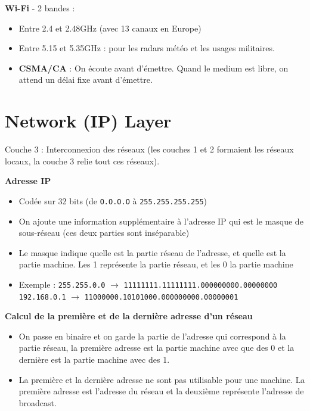 \documentclass[a4paper,9pt, twocolumn]{article}
\begin{document}
	\textbf{Wi-Fi} - 2 bandes : 
	\begin{itemize}
		\item Entre 2.4 et 2.48GHz (avec 13 canaux en Europe)
		\item Entre 5.15 et 5.35GHz : pour les radars météo et les usages militaires.
		\item \textbf{CSMA/CA} : On écoute avant d'émettre. Quand le medium est libre, on attend un délai fixe avant d'émettre.
	\end{itemize}
	
	
\section*{Network (IP) Layer}

	Couche 3 : Interconnexion des réseaux (les couches 1 et 2 formaient les réseaux locaux, la couche 3 relie tout ces réseaux).
	
	\textbf{Adresse IP}
	\begin{itemize}
		\item Codée sur 32 bits (de \texttt{O.O.O.O} à \texttt{255.255.255.255})
		\item On ajoute une information supplémentaire à l'adresse IP qui est le masque de sous-réseau (ces deux parties sont inséparable)
		\item Le masque indique quelle est la partie réseau de l'adresse, et quelle est la partie machine. Les 1 représente la partie réseau, et les 0 la partie machine
		\item Exemple : 
		\texttt{255.255.0.0} $\longrightarrow$ \texttt{11111111.11111111.000000000.00000000}
		\texttt{192.168.0.1} $\longrightarrow$ \texttt{11000000.10101000.000000000.00000001}
	\end{itemize}

	\textbf{Calcul de la première et de la dernière adresse d'un réseau}
	\begin{itemize}
		\item On passe en binaire et on garde la partie de l'adresse qui correspond à la partie réseau, la première adresse est la partie machine avec que des 0 et la dernière est la partie machine avec des 1.
		\item La première et la dernière adresse ne sont pas utilisable pour une machine. La première adresse est l'adresse du réseau et la deuxième représente l'adresse de broadcast.
	\end{itemize}
	
\end{document}
